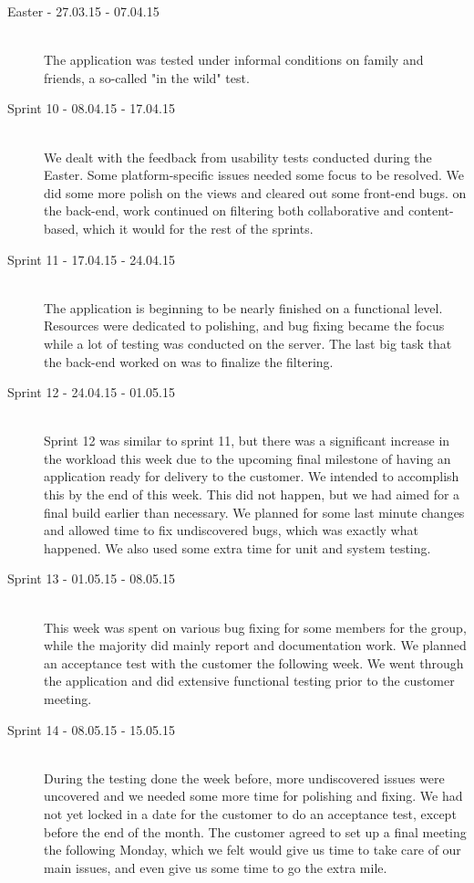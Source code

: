 \begin{description}
	\item[Easter - 27.03.15 - 07.04.15] \hfill \\ 
	The application was tested under informal conditions on family and friends, a so-called "in the wild" test.
	
	\item[Sprint 10 - 08.04.15 - 17.04.15] \hfill \\ 
	We dealt with the feedback from usability tests conducted during the Easter. Some platform-specific issues needed some focus to be resolved. We did some more polish on the views and cleared out some front-end bugs. on the back-end, work continued on filtering both collaborative and content-based, which it would for the rest of the sprints. 

	\item[Sprint 11 - 17.04.15 - 24.04.15] \hfill \\ 
	The application is beginning to be nearly finished on a functional level. Resources were dedicated to polishing, and bug fixing became the focus while a lot of testing was conducted on the server. The last big task that the back-end worked on was to finalize the filtering.

	\item[Sprint 12 - 24.04.15 - 01.05.15] \hfill \\ 
	Sprint 12 was similar to sprint 11, but there was a significant increase in the workload this week due to the upcoming final milestone of having an application ready for delivery to the customer. We intended to accomplish this by the end of this week. This did not happen, but we had aimed for a final build earlier than necessary. We planned for some last minute changes and allowed time to fix undiscovered bugs, which was exactly what happened. We also used some extra time for unit and system testing.
	
	\item[Sprint 13 - 01.05.15 - 08.05.15] \hfill \\ 
	This week was spent on various bug fixing for some members for the group, while the majority did mainly report and documentation work. We planned an acceptance test with the customer the following week. We went through the application and did extensive functional testing prior to the customer meeting.

	\item[Sprint 14 - 08.05.15 - 15.05.15] \hfill \\ 
	During the testing done the week before, more undiscovered issues were uncovered and we needed some more time for polishing and fixing. We had not yet locked in a date for the customer to do an acceptance test, except before the end of the month. The customer agreed to set up a final meeting the following Monday, which we felt would give us time to take care of our main issues, and even give us some time to go the extra mile.
	

\end{description}

